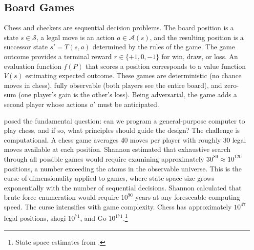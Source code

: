 
\subsection{Board Games}

Chess and checkers are sequential decision problems. The board position is a state $s \in \mathcal{S}$, a legal move is an action $a \in \mathcal{A}(s)$, and the resulting position is a successor state $s' = T(s,a)$ determined by the rules of the game. The game outcome provides a terminal reward $r \in \{+1, 0, -1\}$ for win, draw, or loss. An evaluation function $f(P)$ that scores a position corresponds to a value function $V(s)$ estimating expected outcome. These games are deterministic (no chance moves in chess), fully observable (both players see the entire board), and zero-sum (one player's gain is the other's loss). Being adversarial, the game adds a second player whose actions $a'$ must be anticipated.

\citet{Shannon1950} posed the fundamental question: can we program a general-purpose computer to play chess, and if so, what principles should guide the design? The challenge is computational. A chess game averages 40 moves per player with roughly 30 legal moves available at each position. Shannon estimated that exhaustive search through all possible games would require examining approximately $30^{80} \approx 10^{120}$ positions, a number exceeding the atoms in the observable universe. This is the curse of dimensionality applied to games, where state space size grows exponentially with the number of sequential decisions. Shannon calculated that brute-force enumeration would require $10^{90}$ years at any foreseeable computing speed. The curse intensifies with game complexity. Chess has approximately $10^{47}$ legal positions, shogi $10^{71}$, and Go $10^{171}$.\footnote{State space estimates from \citet{Igami2020}.}

